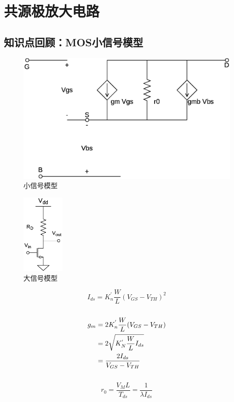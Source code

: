 \documentclass[twoside,a4paper,openright,titlepage,draft]{ctexrep}
\begin{document}
\section{共源极放大电路}
\subsection{知识点回顾：MOS小信号模型\\}
\begin{multicols}{2}
    \begin{figure}[H]
        \centering
        \includegraphics[width=\columnwidth]{smallsignal.eps}
        \caption{小信号模型}
        \label{fig:小信号模型}
    \end{figure}
    \begin{figure}[H]
        \centering
        \includegraphics[height=40mm]{bigsignal.eps}
        \caption{大信号模型}
        \label{fig:大信号模型}
    \end{figure}
    \columnbreak
    \begin{equation}
        I_{ds} = K_{n}^{'}\frac{W}{L}(V_{GS} - V_{TH})^2
    \end{equation}
    \\
    \begin{align}
        g_{m} &= 2K_{n}^{'}\frac{W}{L}(V_{GS} - V_{TH}) \notag \\
        &= 2\sqrt{K_{N}^{'}\frac{W}{L}I_{ds}} \notag \\
        &= \frac{2I_{ds}}{V_{GS}-V_{TH}}
    \end{align}
    \\
    \begin{equation}
        r_0 = \frac{V_ML}{T_{ds}} =\frac{1}{\lambda I_{ds}}
    \end{equation} \\

\end{multicols}
\end{document}
